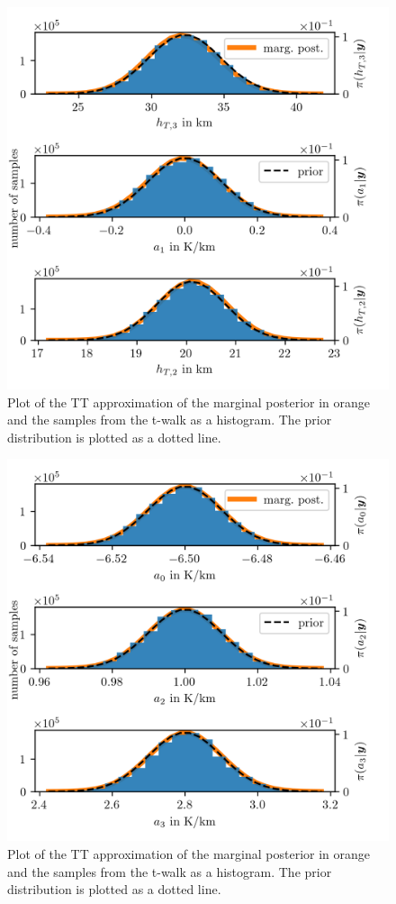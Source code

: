 \begin{figure}[ht!]
	\centering
	\includegraphics{PHdPTPost2.png}
	\caption[Histograms and TT approximation of posterior distribution as well as hyper-prior distribution.]{Plot of the TT approximation of the marginal posterior in orange and the samples from the t-walk as a histogram. The prior distribution is plotted as a dotted line.}
	\label{fig:PostHistTT2}
\end{figure}
\begin{figure}[ht!]
	\centering
	\includegraphics{PHdPTPost3.png}
	\caption[Histograms and TT approximation of posterior distribution as well as hyper-prior distribution.]{Plot of the TT approximation of the marginal posterior in orange and the samples from the t-walk as a histogram. The prior distribution is plotted as a dotted line.}
	\label{fig:PostHistTT3}
\end{figure}
